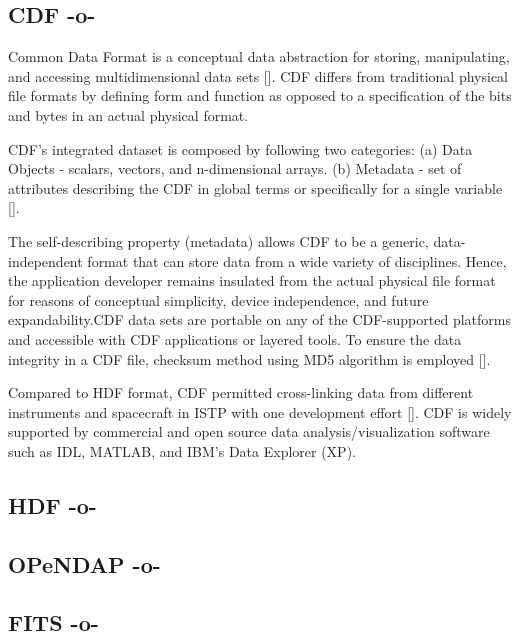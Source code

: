 \subsection{CDF -o-}

Common Data Format is a conceptual data abstraction for storing,
manipulating, and accessing multidimensional data
sets [\cite{www-cdf}]. CDF differs from traditional physical file
formats by defining form and function as opposed to a specification of
the bits and bytes in an actual physical format.
 
CDF's integrated dataset is composed by following two categories:
(a) Data Objects - scalars, vectors, and n-dimensional
arrays. (b) Metadata - set of attributes describing the CDF in global
terms or specifically for a single variable [\cite{user-guide-cdf}].

The self-describing property (metadata) allows CDF to be a generic,
data-independent format that can store data from a wide variety of
disciplines. Hence, the application developer remains insulated from
the actual physical file format for reasons of conceptual simplicity,
device independence, and future expandability.CDF data sets are
portable on any of the CDF-supported platforms and accessible with CDF
applications or layered tools. To ensure the data integrity in a CDF
file, checksum method using MD5 algorithm is
employed [\cite{www-digitalpreserve}].

Compared to HDF format, CDF permitted cross-linking data from
different instruments and spacecraft in ISTP with one development
effort [\cite{www-wiki-hdf}].  CDF is widely supported by commercial and
open source data analysis/visualization software such as IDL, MATLAB,
and IBM's Data Explorer (XP).



\subsection{HDF -o-}



\subsection{OPeNDAP -o-}


\subsection{FITS -o-}

